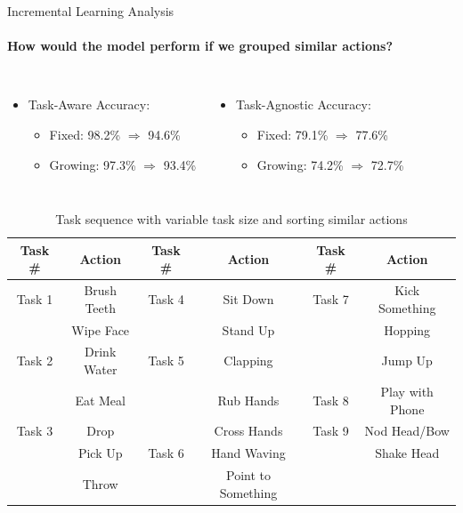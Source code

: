 \documentclass[aspectratio=169, xcolor=dvipsnames]{beamer}
\begin{document}
\begin{frame}{Incremental Learning Analysis}
      \framesubtitle{How would the model perform if we grouped similar actions?}%
      
      \vspace{0.25cm}
      \begin{columns}
      \begin{itemize}
            \item Task-Aware Accuracy: 
            \begin{itemize}
                  \item \small Fixed: 98.2\% $\Longrightarrow$ 94.6\%
                  \item \small Growing: 97.3\% $\Longrightarrow$ 93.4\%
            \end{itemize}
      \end{itemize}
      \begin{itemize}
            \item Task-Agnostic Accuracy: 
            \begin{itemize}
                  \item \small Fixed: 79.1\% $\Longrightarrow$ 77.6\%
                  \item \small Growing: 74.2\% $\Longrightarrow$ 72.7\%
            \end{itemize}
      \end{itemize}
      \end{columns}
      \vspace{0.5cm}
      \begin{table}[ht!]
      \centering
      {\footnotesize
      \begin{tabular}{ | c | c | c | c | c | c | }
            \hline
            \rowcolor{gray!25}
            Task \# & Action & Task \# & Action & Task \# & Action \\
            \hline
            Task 1 & Brush Teeth & Task 4 & Sit Down & Task 7 & Kick Something \\
            & Wipe Face & & Stand Up & & Hopping \\
            \cline{1-4}
            Task 2 & Drink Water & Task 5 & Clapping & & Jump Up \\
            \cline{5-6}
            & Eat Meal & & Rub Hands & Task 8 & Play with Phone \\
            \cline{1-2}
            \cline{5-6}
            Task 3 & Drop & & Cross Hands & Task 9 & Nod Head/Bow \\
            \cline{3-4}
            & Pick Up & Task 6 & Hand Waving & & Shake Head \\
            & Throw & & Point to Something & & \\
            \hline
      \end{tabular}
      }
      \caption{Task sequence with variable task size and sorting similar actions}
      \end{table}
\end{frame}
\end{document}
